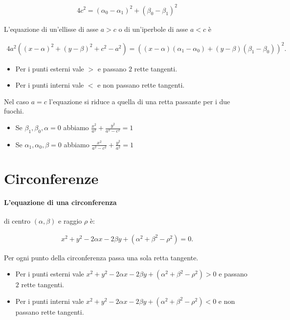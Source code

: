 \documentclass{article}
\begin{document}
\begin{align*}
4 c^2 = (\alpha_0 - \alpha_1)^2 + (\beta_0 - \beta_1)^2
\end{align*}

L'equazione di un'ellisse di asse $a > c$ o di un'iperbole di asse $a < c$ è

\begin{align*}
4 a^2 \left((x - \alpha)^2 + (y - \beta)^2 + c^2 - a^2\right) = ((x - \alpha) (\alpha_1 - \alpha_0) + (y - \beta) (\beta_1 - \beta_0))^2.
\end{align*}

\begin{itemize}
\item Per i punti esterni vale $>$ e passano $2$ rette tangenti.
\item Per i punti interni vale $<$ e non passano rette tangenti.
\end{itemize}

Nel caso $a = c$ l'equazione si riduce a quella di una retta passante per i due fuochi.

\begin{itemize}
\item Se $\beta_1, \beta_0, \alpha = 0$ abbiamo $\frac{x^2}{a^2} + \frac{y^2}{a^2 - c^2} = 1$
\item Se $\alpha_1, \alpha_0, \beta = 0$ abbiamo $\frac{x^2}{a^2 - c^2} + \frac{y^2}{a^2} = 1$
\end{itemize}

\newpage
\section*{Circonferenze}

\paragraph{L'equazione di una circonferenza} di centro $(\alpha, \beta)$ e raggio $\rho$ è:

\begin{align*}
x^2 + y^2 - 2 \alpha x - 2 \beta y + (\alpha^2 + \beta^2 - \rho^2) = 0.
\end{align*}

Per ogni punto della circonferenza passa una sola retta tangente.

\begin{itemize}
\item Per i punti esterni vale $x^2 + y^2 - 2 \alpha x - 2 \beta y + (\alpha^2 + \beta^2 - \rho^2) > 0$ e passano $2$ rette tangenti.
\item Per i punti interni vale $x^2 + y^2 - 2 \alpha x - 2 \beta y + (\alpha^2 + \beta^2 - \rho^2) < 0$ e non passano rette tangenti.
\end{itemize}
\end{document}
